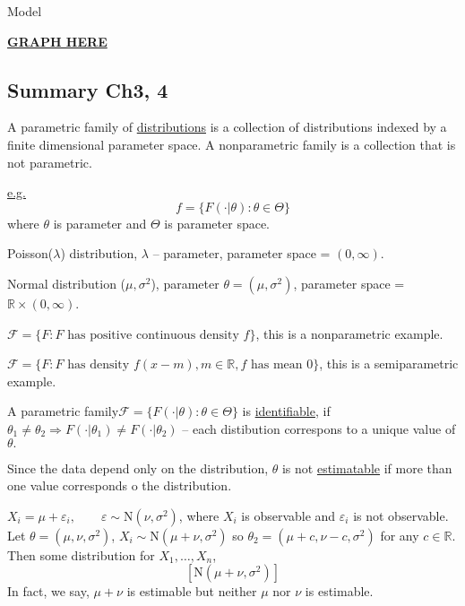 \documentclass[english, 11pt]{article}
\begin{document}
Model

\underline{\textbf{GRAPH HERE}}

\subsection{Summary Ch3, 4}

\begin{defn} 
A parametric family of \underline{distributions} is a collection of distributions indexed by a finite dimensional parameter space. A nonparametric family is a collection that is not parametric.
\end{defn}

\underline{e.g.}
$$
f=\{F(\cdot|\theta):\theta\in\Theta\}
$$
where $\theta$ is parameter and $\Theta$ is parameter space.

\begin{exmp}
Poisson($\lambda$) distribution, $\lambda$ -- parameter, parameter space = $(0, \infty)$.
\end{exmp}


\begin{exmp}
Normal distribution ($\mu,\sigma^2$), parameter $\theta=(\mu, \sigma^2)$, parameter space = $\mathbb{R}\times(0, \infty)$.
\end{exmp}

\begin{exmp}
$\mathscr{F}=\{F:F\text{ has positive continuous density }f\}$, this is a nonparametric example.
\end{exmp}

\begin{exmp}
$\mathscr{F}=\{F:F\text{ has density }f(x-m), m\in\mathbb{R}, f\text{ has mean 0}\}$, this is a semiparametric example.
\end{exmp}

\begin{defn}
A parametric family$\mathscr{F}=\{F(\cdot|\theta):\theta\in\Theta\}$ is \underline{identifiable},  if $\theta_1\not=\theta_2
\Rightarrow F(\cdot|\theta_1)\not=F(\cdot|\theta_2)$ -- each distibution correspons to a unique value of $\theta.$
\end{defn}

Since the data depend only on the distribution, $\theta$ is not \underline{estimatable} if more than one value corresponds o the distribution.

\begin{exmp}
$X_i=\mu+\varepsilon_i, \qquad \varepsilon\sim \text{N}(\nu, \sigma^2)$, where $X_i$ is observable and $\varepsilon_i$ is not observable. Let $\theta=(\mu, \nu, \sigma^2)$, $X_i\sim\text{N}(\mu+\nu, \sigma^2)$ so $\theta_2=(\mu+c, \nu-c, \sigma^2)$ for any $c\in \mathbb{R}$. Then some distribution for $X_1, \dots, X_n$,
$$
\left[\text{N}(\mu+\nu,\sigma^2)\right]
$$
In fact, we say, $\mu+\nu$ is estimable but neither $\mu$ nor $\nu$ is estimable.
\end{exmp}
\end{document}
